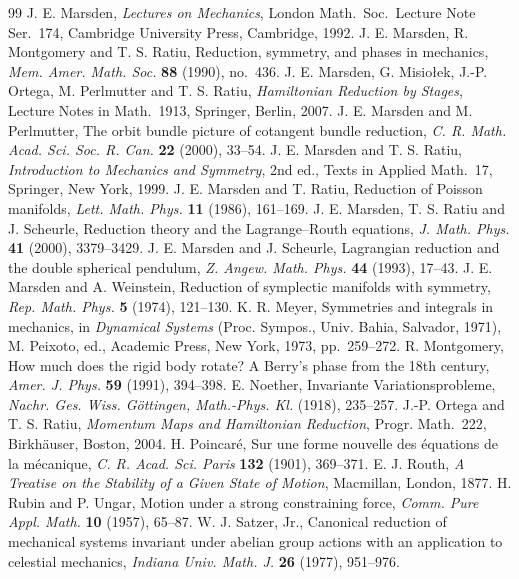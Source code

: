 \documentclass[11pt,a4paper]{article}
\numberwithin{equation}{section}
\theoremstyle{plain}
\theoremstyle{definition}
\theoremstyle{remark}
\begin{document}
\begin{thebibliography}{99}
 J. E. Marsden, \emph{Lectures on Mechanics}, London Math.\ Soc.\ Lecture Note Ser.\ 174, Cambridge University Press, Cambridge, 1992.
 J. E. Marsden, R. Montgomery and T. S. Ratiu, Reduction, symmetry, and phases in mechanics, \emph{Mem. Amer. Math. Soc.} \textbf{88} (1990), no.~436.
 J. E. Marsden, G. Misio{\l}ek, J.-P. Ortega, M. Perlmutter and T. S. Ratiu, \emph{Hamiltonian Reduction by Stages}, Lecture Notes in Math.\ 1913, Springer, Berlin, 2007.
 J. E. Marsden and M. Perlmutter, The orbit bundle picture of cotangent bundle reduction, \emph{C. R. Math. Acad. Sci. Soc. R. Can.} \textbf{22} (2000), 33--54.
 J. E. Marsden and T. S. Ratiu, \emph{Introduction to Mechanics and Symmetry}, 2nd ed., Texts in Applied Math.\ 17, Springer, New York, 1999.
 J. E. Marsden and T. Ratiu, Reduction of Poisson manifolds, \emph{Lett. Math. Phys.} \textbf{11} (1986), 161--169.
 J. E. Marsden, T. S. Ratiu and J. Scheurle, Reduction theory and the Lagrange--Routh equations, \emph{J. Math. Phys.} \textbf{41} (2000), 3379--3429.
 J. E. Marsden and J. Scheurle, Lagrangian reduction and the double spherical pendulum, \emph{Z. Angew. Math. Phys.} \textbf{44} (1993), 17--43.
 J. E. Marsden and A. Weinstein, Reduction of symplectic manifolds with symmetry, \emph{Rep. Math. Phys.} \textbf{5} (1974), 121--130.
 K. R. Meyer, Symmetries and integrals in mechanics, in \emph{Dynamical Systems} (Proc. Sympos., Univ. Bahia, Salvador, 1971), M. Peixoto, ed., Academic Press, New York, 1973, pp.~259--272.
 R. Montgomery, How much does the rigid body rotate? A Berry's phase from the 18th century, \emph{Amer. J. Phys.} \textbf{59} (1991), 394--398.
 E. Noether, Invariante Variationsprobleme, \emph{Nachr. Ges. Wiss. G\"ottingen, Math.-Phys. Kl.} (1918), 235--257.
 J.-P. Ortega and T. S. Ratiu, \emph{Momentum Maps and Hamiltonian Reduction}, Progr. Math.\ 222, Birkh\"auser, Boston, 2004.
 H. Poincar\'e, Sur une forme nouvelle des \'equations de la m\'ecanique, \emph{C. R. Acad. Sci. Paris} \textbf{132} (1901), 369--371.
 E. J. Routh, \emph{A Treatise on the Stability of a Given State of Motion}, Macmillan, London, 1877.
 H. Rubin and P. Ungar, Motion under a strong constraining force, \emph{Comm. Pure Appl. Math.} \textbf{10} (1957), 65--87.
 W. J. Satzer, Jr., Canonical reduction of mechanical systems invariant under abelian group actions with an application to celestial mechanics, \emph{Indiana Univ. Math. J.} \textbf{26} (1977), 951--976.

\end{thebibliography}
\end{document}
